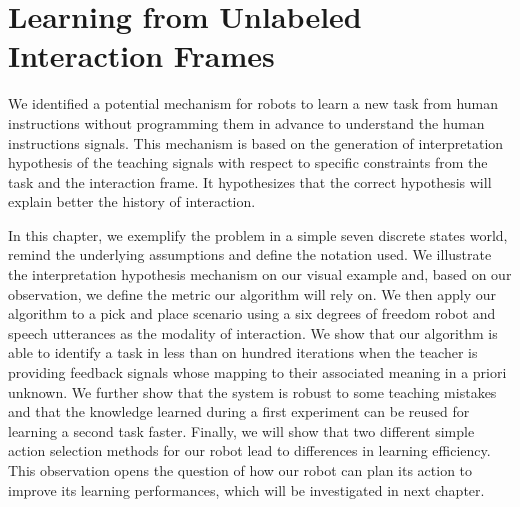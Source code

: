 
\chapter{Learning from Unlabeled Interaction Frames}
\label{chapter:lfui}
\minitoc


We identified a potential mechanism for robots to learn a new task from human instructions without programming them in advance to understand the human instructions signals. This mechanism is based on the generation of interpretation hypothesis of the teaching signals with respect to specific constraints from the task and the interaction frame. It hypothesizes that the correct hypothesis will explain better the history of interaction.

In this chapter, we exemplify the problem in a simple seven discrete states world, remind the underlying assumptions and define the notation used. We illustrate the interpretation hypothesis mechanism on our visual example and, based on our observation, we define the metric our algorithm will rely on. We then apply our algorithm to a pick and place scenario using a six degrees of freedom robot and speech utterances as the modality of interaction. We show that our algorithm is able to identify a task in less than on hundred iterations when the teacher is providing feedback signals whose mapping to their associated meaning in a priori unknown. We further show that the system is robust to some teaching mistakes and that the knowledge learned during a first experiment can be reused for learning a second task faster. Finally, we will show that two different simple action selection methods for our robot lead to differences in learning efficiency. This observation opens the question of how our robot can plan its action to improve its learning performances, which will be investigated in next chapter.

